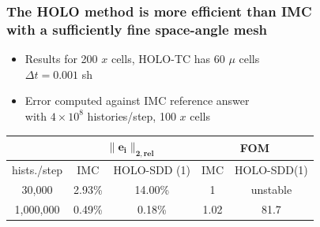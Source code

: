 \documentclass[xcolor=dvipsnames,hyperref={pdfpagelabels=false},unknownkeysallowed]{beamer}
\newcommand{\colb}[1]{{\color{blue} #1}}
\newcommand{\colG}[1]{{\color{Gray!110} #1}}
\newcommand{\colr}[1]{{\color{red} #1}}
\newlength{\wideitemsep}
\let\olditem\item
\renewcommand{\item}{\setlength{\itemsep}{\wideitemsep}\olditem}
\begin{document}
\begin{frame}
    \frametitle{The HOLO method is more efficient than IMC \\ with a sufficiently fine space-angle mesh}
    \begin{itemize}
        \item Results for 200 $x$ cells, HOLO-TC has 60 $\mu$ cells \\ \colG{ $\Delta t =
            0.001$ sh}
        \item Error computed against IMC reference answer \\  with $4\times10^8$
            histories/step, 100 $x$ cells
    \end{itemize}
    \begin{table}
\begin{tabular}{|c|cc|cc|}\cline{2-5}
    \multicolumn{1}{c|}{}       & \multicolumn{2}{|c|}{$\mathbf{\|e_i\|_{2,rel}}$} &
    \multicolumn{2}{|c|}{\textbf{FOM}} \\ \hline
hists./step   & IMC     & HOLO-SDD (1) &    IMC   & HOLO-SDD(1)  \\ \hline
    30,000     & 2.93\%  & \colr{14.00\%}    & 1      &  \colr{unstable}      \\
    1,000,000   & 0.49\%  &\colb{ 0.18\% }   & 1.02   & \colb{ 81.7}      \\ \hline
\end{tabular}
\end{table}

\end{frame}
\end{document}
